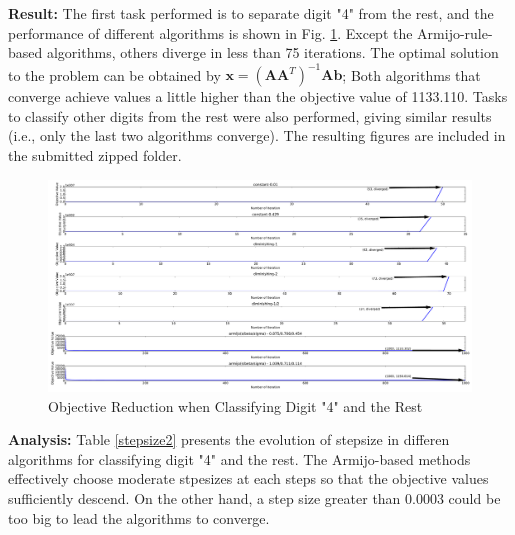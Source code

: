 \documentclass[11pt]{article}
\newcommand\result{\vspace{.10in}\textbf{Result: }}
\newcommand\analysis{\vspace{.10in}\textbf{Analysis: }}
\begin{document}
\result The first task performed is to separate digit "4" from the rest, and the performance of different algorithms is shown in Fig. \ref{fig:digit4}. Except the Armijo-rule-based algorithms, others diverge in less than 75 iterations. The optimal solution to the problem can be obtained by $\mathbf{x}=(\mathbf{A}\mathbf{A}^T)^{-1}\mathbf{A}\mathbf{b}$; Both algorithms that converge achieve values a little higher than the objective value of 1133.110. Tasks to classify other digits from the rest were also performed, giving similar results (i.e., only the last two algorithms converge). The resulting figures are included in the submitted zipped folder.
\begin{figure}[!tb]
\centering
\includegraphics[width=6.3in]{digit-4_rest.pdf}
\caption{Objective Reduction when Classifying Digit "4" and the Rest}
\label{fig:digit4}
\end{figure}

\analysis Table \ref{stepsize2} presents the evolution of stepsize in differen algorithms for classifying digit "4" and the rest. The Armijo-based methods effectively choose moderate stpesizes at each steps so that the objective values sufficiently descend. On the other hand, a step size greater than 0.0003 could be too big to lead the algorithms to converge.
\end{document}
